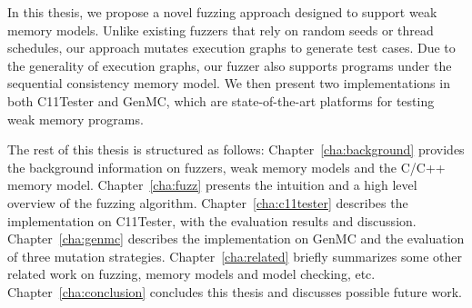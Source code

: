 
In this thesis, we propose a novel fuzzing approach designed to support weak memory models. Unlike existing fuzzers that rely on random seeds or thread schedules, our approach mutates execution graphs to generate test cases. Due to the generality of execution graphs, our fuzzer also supports programs under the sequential consistency memory model. We then present two implementations in both C11Tester and GenMC, which are state-of-the-art platforms for testing weak memory programs.


The rest of this thesis is structured as follows: Chapter~\ref{cha:background} provides the background information on fuzzers, weak memory models and the C/C++ memory model. Chapter~\ref{cha:fuzz} presents the intuition and a high level overview of the fuzzing algorithm. Chapter~\ref{cha:c11tester} describes the implementation on C11Tester, with the evaluation results and discussion. Chapter~\ref{cha:genmc} describes the implementation on GenMC and the evaluation of three mutation strategies. Chapter~\ref{cha:related} briefly summarizes some other related work on fuzzing, memory models and model checking, etc. Chapter~\ref{cha:conclusion} concludes this thesis and discusses possible future work. 





